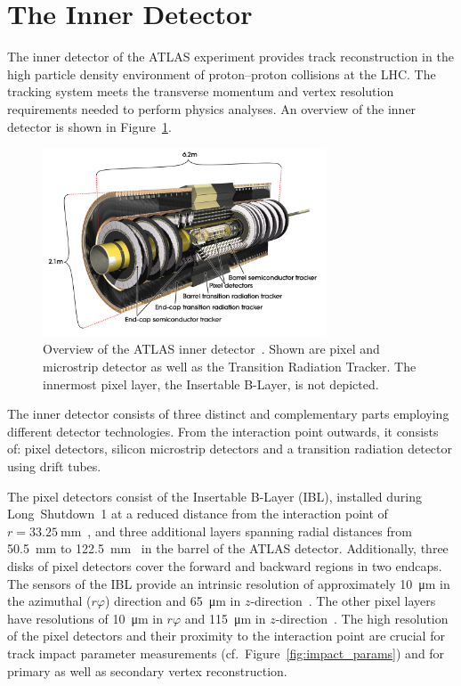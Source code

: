 \section{The Inner Detector}
\label{sec:atlas_tracking}

The inner detector of the ATLAS experiment provides track reconstruction in the
high particle density environment of proton--proton collisions at the LHC. The
tracking system meets the transverse momentum and vertex resolution requirements
needed to perform physics analyses. An overview of the inner detector is shown
in Figure~\ref{fig:atlas_indet}.

\begin{figure}[htb]
  \centering
  \includegraphics[width=0.75\textwidth]{./figures/atlas/inner_detector.jpg}
  \caption[Overview of the ATLAS inner detector]{Overview of the ATLAS inner
    detector~\cite{indet_fig}. Shown are pixel and microstrip detector as well
    as the Transition Radiation Tracker. The innermost pixel layer, the
    Insertable B-Layer, is not depicted.}
  \label{fig:atlas_indet}
\end{figure}

The inner detector consists of three distinct and complementary parts employing
different detector technologies. From the interaction point outwards, it
consists of: pixel detectors, silicon microstrip detectors and a transition
radiation detector using drift tubes.

The pixel detectors consist of the Insertable B-Layer (IBL), installed during
Long~Shutdown~1 at a reduced distance from the interaction point
of~$r = \SI{33.25}{\milli\metre}$~\cite{ibl_tdr}, and three additional layers
spanning radial distances from \SI{50.5}{\milli\metre} to
\SI{122.5}{\milli\metre}~\cite{atlas_detector} in the barrel of the ATLAS
detector. Additionally, three disks of pixel detectors cover the forward and
backward regions in two endcaps. The sensors of the IBL provide an intrinsic
resolution of approximately \SI{10}{\micro\metre} in the azimuthal ($r\varphi$)
direction and \SI{65}{\micro\metre} in $z$-direction~\cite{ibl_measurement}. The
other pixel layers have resolutions of \SI{10}{\micro\metre} in $r\varphi$ and
\SI{115}{\micro\metre} in $z$-direction~\cite{atlas_detector}. The high
resolution of the pixel detectors and their proximity to the interaction point
are crucial for track impact parameter measurements (cf.\
Figure~\ref{fig:impact_params}) and for primary as well as secondary vertex
reconstruction.

